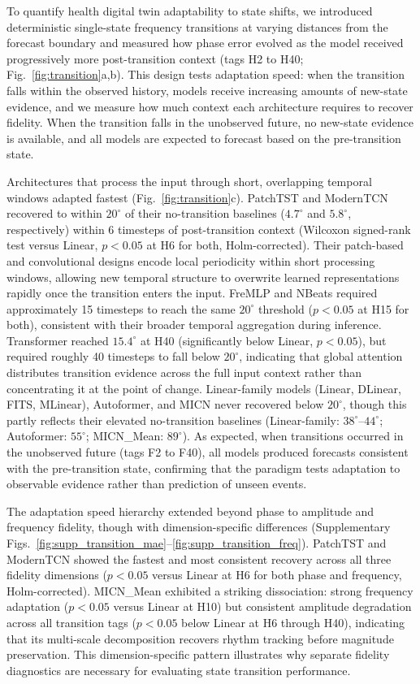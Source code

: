 To quantify health digital twin adaptability to state shifts, we introduced deterministic single-state frequency transitions at varying distances from the forecast boundary and measured how phase error evolved as the model received progressively more post-transition context (tags H2 to H40; Fig.~\ref{fig:transition}a,b). This design tests adaptation speed: when the transition falls within the observed history, models receive increasing amounts of new-state evidence, and we measure how much context each architecture requires to recover fidelity. When the transition falls in the unobserved future, no new-state evidence is available, and all models are expected to forecast based on the pre-transition state.

Architectures that process the input through short, overlapping temporal windows adapted fastest (Fig.~\ref{fig:transition}c). PatchTST and ModernTCN recovered to within $20^{\circ}$ of their no-transition baselines ($4.7^{\circ}$ and $5.8^{\circ}$, respectively) within 6 timesteps of post-transition context (Wilcoxon signed-rank test versus Linear, $p < 0.05$ at H6 for both, Holm-corrected). Their patch-based and convolutional designs encode local periodicity within short processing windows, allowing new temporal structure to overwrite learned representations rapidly once the transition enters the input. FreMLP and NBeats required approximately 15 timesteps to reach the same $20^{\circ}$ threshold ($p < 0.05$ at H15 for both), consistent with their broader temporal aggregation during inference. Transformer reached $15.4^{\circ}$ at H40 (significantly below Linear, $p < 0.05$), but required roughly 40 timesteps to fall below $20^{\circ}$, indicating that global attention distributes transition evidence across the full input context rather than concentrating it at the point of change. Linear-family models (Linear, DLinear, FITS, MLinear), Autoformer, and MICN never recovered below $20^{\circ}$, though this partly reflects their elevated no-transition baselines (Linear-family: $38^{\circ}$--$44^{\circ}$; Autoformer: $55^{\circ}$; MICN\_Mean: $89^{\circ}$). As expected, when transitions occurred in the unobserved future (tags F2 to F40), all models produced forecasts consistent with the pre-transition state, confirming that the paradigm tests adaptation to observable evidence rather than prediction of unseen events.

The adaptation speed hierarchy extended beyond phase to amplitude and frequency fidelity, though with dimension-specific differences (Supplementary Figs.~\ref{fig:supp_transition_mae}--\ref{fig:supp_transition_freq}). PatchTST and ModernTCN showed the fastest and most consistent recovery across all three fidelity dimensions ($p < 0.05$ versus Linear at H6 for both phase and frequency, Holm-corrected). MICN\_Mean exhibited a striking dissociation: strong frequency adaptation ($p < 0.05$ versus Linear at H10) but consistent amplitude degradation across all transition tags ($p < 0.05$ below Linear at H6 through H40), indicating that its multi-scale decomposition recovers rhythm tracking before magnitude preservation. This dimension-specific pattern illustrates why separate fidelity diagnostics are necessary for evaluating state transition performance.

